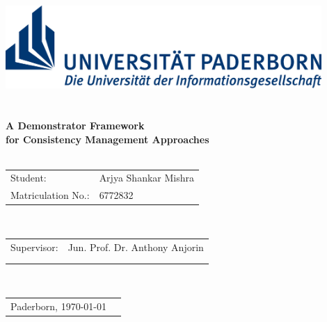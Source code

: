 \documentclass[%
				12pt,
				a4paper,
				twoside,
				titlepage,
				headsepline,
				numbers=noenddot,
				listof=totoc,
				index=totoc,
				bibliography=totoc]{scrartcl}
\theoremstyle{break}
\begin{document}
                

	\begin{titlepage}
	\thispagestyle{empty}
	\begin{center}

			\includegraphics[width=12cm]{figures/Logo_Uni_Paderborn}\\
                      
      		\vspace{3cm}
			{\LARGE  {}} \\
			\vspace{0,3cm}
			 \\
			\vspace{0,3cm}
			{\LARGE  \textbf{A Demonstrator Framework\\ 
					for Consistency Management Approaches}} \\ 
			\vspace{1cm}
			 \\
			\vspace{0,3cm}
			\begin{tabular}{l l}
				Student: & Arjya Shankar Mishra \\
				Matriculation No.: & 6772832\\
			\end{tabular}\\	
			\vspace{3cm}
			\begin{tabular}{l l}
				Supervisor: & Jun. Prof. Dr. Anthony Anjorin \\ \\ \\
			\end{tabular}\\ 
			\vspace{3cm}	
			\begin{tabular}{l l}
				Paderborn, \today \\
			\end{tabular}\\	
					
	\end{center}
	\end{titlepage}
	\clearpage

  
	\setcounter{page}{2}
	
  
  	
  	\newpage
  	
  	\newpage
  	
  	
	\clearpage
\end{document}
